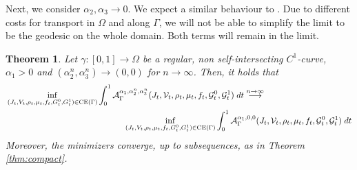\documentclass{article}
\def\calA{{\mathcal A}} \def\calB{{\mathcal B}} \def\calC{{\mathcal C}}
\newtheorem{theorem}{Theorem}[section]
\begin{document}
Next, we consider $\alpha_2, \alpha_3\to 0$. We expect a similar behaviour to \cite[Theorem 7]{monsaingeon2021new}. Due to different costs for transport in $\Omega$ and along $\Gamma$, we will not be able to simplify the limit to be the geodesic on the whole domain. Both terms will remain in the limit. 

\begin{theorem}
     Let $\gamma:[0,1]\to\Omega$ be a regular, non self-intersecting $C^1$-curve,  $\alpha_1>0$ and $(\alpha_2^n, \alpha_3^n) \rightarrow (0,0)$ for $n\to\infty$. Then, it holds that 
    \begin{align*}
        & \inf_{(J_t, V_t, \rho_t, \mu_t, f_t, G^0_t, G^1_t) \in {\rm CE}(\Gamma)}  \int_{0}^{1} \calA_\Gamma^{\alpha_1, \alpha^n_2, \alpha^n_3}(J_t, \mathcal{V}_t, \rho_t, \mu_t, f_t, \mathcal{G}_t^0, \mathcal{G}_t^1)\; dt \overset{n\to\infty}{\longrightarrow} \\
        & \qquad \qquad \qquad \qquad \qquad \qquad \qquad \inf_{(J_t, V_t, \rho_t, \mu_t, f_t, G^0_t, G^1_t) \in {\rm CE}(\Gamma)}   \int_{0}^{1} \calA_\Gamma^{\alpha_1, 0, 0}(J_t, \mathcal{V}_t, \rho_t, \mu_t, f_t, \mathcal{G}_t^0, \mathcal{G}_t^1)\; dt
    \end{align*}
    Moreover, the minimizers converge, up to subsequences, as in Theorem \ref{thm:compact}.
\end{theorem}
\end{document}
